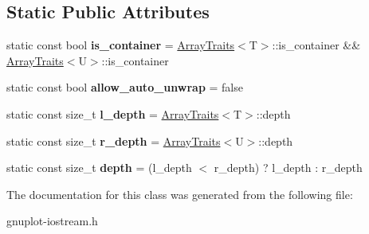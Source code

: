 \subsection*{Static Public Attributes}
\begin{DoxyCompactItemize}
\item 
\mbox{\label{classgnuplotio_1_1ArrayTraits_3_01std_1_1pair_3_01T_00_01U_01_4_01_4_a8656ab8094037d88b470f718ff7197e0}} 
static const bool {\bfseries is\+\_\+container} = \hyperlink{classgnuplotio_1_1ArrayTraits}{Array\+Traits}$<$T$>$\+::is\+\_\+container \&\& \hyperlink{classgnuplotio_1_1ArrayTraits}{Array\+Traits}$<$U$>$\+::is\+\_\+container
\item 
\mbox{\label{classgnuplotio_1_1ArrayTraits_3_01std_1_1pair_3_01T_00_01U_01_4_01_4_afff9ebffb39ab8660bb59ffcc7d8a2e5}} 
static const bool {\bfseries allow\+\_\+auto\+\_\+unwrap} = false
\item 
\mbox{\label{classgnuplotio_1_1ArrayTraits_3_01std_1_1pair_3_01T_00_01U_01_4_01_4_ae8be9661c88a8970da3d87c1afc063dc}} 
static const size\+\_\+t {\bfseries l\+\_\+depth} = \hyperlink{classgnuplotio_1_1ArrayTraits}{Array\+Traits}$<$T$>$\+::depth
\item 
\mbox{\label{classgnuplotio_1_1ArrayTraits_3_01std_1_1pair_3_01T_00_01U_01_4_01_4_a1b7e7f8976a5d0ed20b93ede3e25a546}} 
static const size\+\_\+t {\bfseries r\+\_\+depth} = \hyperlink{classgnuplotio_1_1ArrayTraits}{Array\+Traits}$<$U$>$\+::depth
\item 
\mbox{\label{classgnuplotio_1_1ArrayTraits_3_01std_1_1pair_3_01T_00_01U_01_4_01_4_a11b3be89ac9506fcfcceb318acc7e2bf}} 
static const size\+\_\+t {\bfseries depth} = (l\+\_\+depth $<$ r\+\_\+depth) ? l\+\_\+depth \+: r\+\_\+depth
\end{DoxyCompactItemize}


The documentation for this class was generated from the following file\+:\begin{DoxyCompactItemize}
\item 
gnuplot-\/iostream.\+h\end{DoxyCompactItemize}
